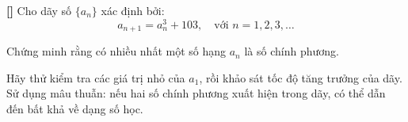 \documentclass[../05-modular-arithmetic-a.tex]{subfiles}
\begin{document}
\begin{exercise*}\label{example:TWN-2015-TST2-Q2-P1}\textbf{[]}
    Cho dãy số \( \{a_n\} \) xác định bởi:
    \[
        a_{n+1} = a_n^3 + 103,\quad \text{với } n = 1, 2, 3, \dots
    \]
    
    Chứng minh rằng có nhiều nhất một số hạng \( a_n \) là số chính phương.    
\end{exercise*}

\begin{remark*}
    Hãy thử kiểm tra các giá trị nhỏ của \( a_1 \), rồi khảo sát tốc độ tăng trưởng của dãy. Sử dụng mâu thuẫn: nếu hai số chính phương xuất hiện trong dãy, có thể dẫn đến bất khả về dạng số học.
\end{remark*}


\end{document}
